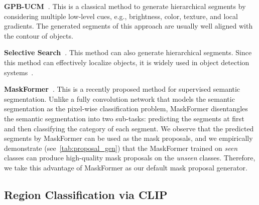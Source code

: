 \documentclass[runningheads]{llncs}
\begin{document}
\noindent\textbf{GPB-UCM~\cite{arbelaez2010contour}}. 
This is a classical method to generate hierarchical segments by considering multiple low-level cues, e.g., brightness, color, texture, and local gradients. The generated segments of this approach are usually well aligned with the contour of objects. 


\noindent\textbf{Selective Search~\cite{uijlings2013selective}}. 
This method can also generate hierarchical segments. Since this method can effectively localize objects, it is widely used in object detection systems~\cite{girshick2015fast,girshick2014rich}.


\noindent\textbf{MaskFormer~\cite{cheng2021per}}. 
This is a recently proposed method for supervised semantic segmentation. Unlike a fully convolution network that models the semantic segmentation as the pixel-wise classification problem, MaskFormer disentangles the semantic segmentation into two sub-tasks: predicting the segments at first and then classifying the category of each segment. We observe that the predicted segments by MaskFormer can be used as the mask proposals, and we empirically demonstrate (see~\cref{tab:proposal_gen}) that the MaskFormer trained on \emph{seen} classes can produce high-quality mask proposals on the \emph{unseen} classes. Therefore, we take this advantage of MaskFormer as our default mask proposal generator.

\subsection{Region Classification via CLIP}
\label{sec:region_classification}
\end{document}
